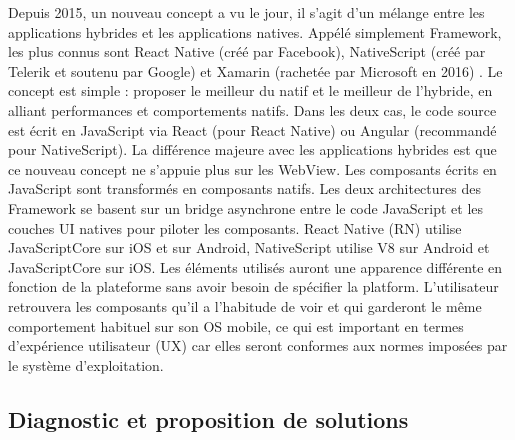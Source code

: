 Depuis 2015, un nouveau concept a vu le jour, il s’agit d’un mélange entre les applications hybrides et les applications natives. Appélé simplement Framework, les plus connus sont React Native (créé par Facebook), NativeScript (créé par Telerik et soutenu par Google) et Xamarin (rachetée par Microsoft en 2016) . Le concept est simple : proposer le meilleur du natif et le meilleur de l’hybride, en alliant performances et comportements natifs. Dans les deux cas, le code source est écrit en JavaScript via React (pour React Native) ou Angular (recommandé pour NativeScript). La différence majeure avec les applications hybrides est que ce nouveau concept ne s’appuie plus sur les WebView. Les composants écrits en JavaScript sont transformés en composants natifs. Les deux architectures des Framework se basent sur un bridge asynchrone entre le code JavaScript et les couches UI natives pour piloter les composants. React Native (RN) utilise JavaScriptCore sur iOS et sur Android, NativeScript utilise V8 sur Android et JavaScriptCore sur iOS.  Les éléments utilisés auront une apparence différente en fonction de la plateforme sans avoir besoin de spécifier la platform. L’utilisateur retrouvera les composants qu’il a l’habitude de voir et qui garderont le même comportement habituel sur son OS mobile, ce qui est important en termes d’expérience utilisateur (UX) car elles seront conformes aux normes imposées par le système d'exploitation.



\subsection{Diagnostic et proposition de solutions }

